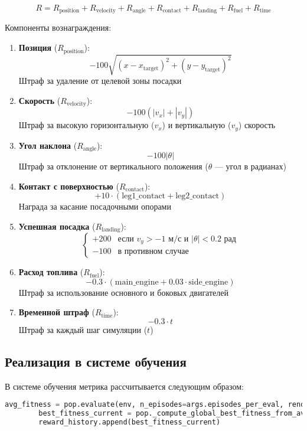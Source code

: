 \documentclass[a4paper,12pt]{article}
\begin{document}
\[
R = R_{\text{position}} + R_{\text{velocity}} + R_{\text{angle}} + R_{\text{contact}} + R_{\text{landing}} + R_{\text{fuel}} + R_{\text{time}}
\]

Компоненты вознаграждения:
\begin{enumerate}
	\item \textbf{Позиция} ($R_{\text{position}}$): 
	\[
	-100 \sqrt{(x - x_{\text{target}})^2 + (y - y_{\text{target}})^2}
	\]
	Штраф за удаление от целевой зоны посадки
	
	\item \textbf{Скорость} ($R_{\text{velocity}}$):
	\[
	-100 \left( |v_x| + |v_y| \right)
	\]
	Штраф за высокую горизонтальную ($v_x$) и вертикальную ($v_y$) скорость
	
	\item \textbf{Угол наклона} ($R_{\text{angle}}$):
	\[
	-100 |\theta|
	\]
	Штраф за отклонение от вертикального положения ($\theta$ — угол в радианах)
	
	\item \textbf{Контакт с поверхностью} ($R_{\text{contact}}$):
	\[
	+10 \cdot (\text{leg1\_contact} + \text{leg2\_contact})
	\]
	Награда за касание посадочными опорами
	
	\item \textbf{Успешная посадка} ($R_{\text{landing}}$):
	\[
	\begin{cases} 
		+200 & \text{если } v_y > -1 \text{ м/с и } |\theta| < 0.2 \text{ рад} \\
		-100 & \text{в противном случае}
	\end{cases}
	\]
	
	\item \textbf{Расход топлива} ($R_{\text{fuel}}$):
	\[
	-0.3 \cdot (\text{main\_engine} + 0.03 \cdot \text{side\_engine})
	\]
	Штраф за использование основного и боковых двигателей
	
	\item \textbf{Временной штраф} ($R_{\text{time}}$):
	\[
	-0.3 \cdot t
	\]
	Штраф за каждый шаг симуляции ($t$)
\end{enumerate}

\subsection{Реализация в системе обучения}
В системе обучения метрика рассчитывается следующим образом:

\begin{lstlisting}[language=Python]
		avg_fitness = pop.evaluate(env, n_episodes=args.episodes_per_eval, render=False)
		best_fitness_current = pop._compute_global_best_fitness_from_avg(avg_fitness)
		reward_history.append(best_fitness_current) 
\end{lstlisting}
\end{document}

